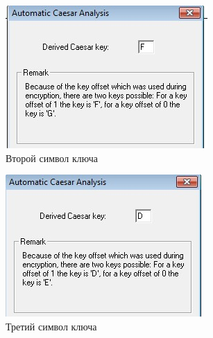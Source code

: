 \documentclass[a4paper, 14pt]{extarticle}
\begin{document}
\begin{enumerate}
\begin{itemize}
\begin{figure}[h]
        \begin{subfigure}[b]{0.3\textwidth}
        	\includegraphics[width=\textwidth]{img/S014.jpg}
        	\caption{Второй символ ключа}
        \end{subfigure}%
        \hspace{0.5cm}
        \begin{subfigure}[b]{0.3\textwidth}
        	\includegraphics[width=\textwidth]{img/S015.jpg}
        	\caption{Третий символ ключа}
        \end{subfigure}%
        \hspace{0.5cm}
        \begin{subfigure}[b]{0.3\textwidth}

\end{subfigure}
\end{figure}
\end{itemize}
\end{enumerate}
\end{document}
